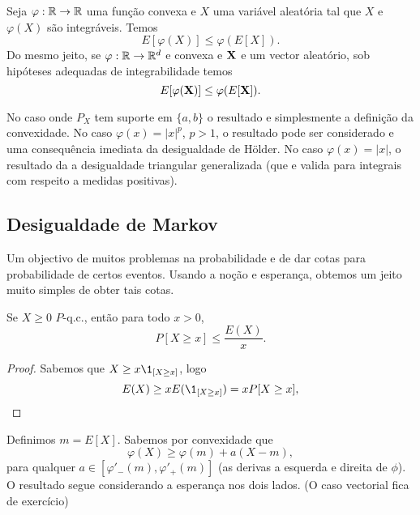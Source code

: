 \begin{proposition}
 Seja $\varphi:{\mathbb R} \to {\ensuremath{\mathbb R}}$ uma função convexa e $X$ uma variável  aleatória tal que $X$ e $\varphi(X)$ são integráveis.
 Temos
 \begin{equation}
  E[ \varphi(X) ] \le \varphi(E[X]).
 \end{equation}
 Do mesmo jeito, se $\varphi:{\mathbb R} \to {\ensuremath{\mathbb R}}^d$ e convexa e ${\bf X}$ e um vector aleatório, sob hipóteses adequadas de integrabilidade temos
  \begin{equation}
  E[ \varphi({\bf X}) ] \le \varphi(E[{\bf X}]).
 \end{equation}
\end{proposition}

\begin{remark}
  No caso onde $P_X$ tem suporte em $\{a,b\}$ o resultado e simplesmente a definição da convexidade.
  No caso $\varphi(x)=|x|^p$, $p>1$, o resultado pode ser considerado e uma consequência imediata da desigualdade de H\"older.
  No caso $\varphi(x)=|x|$, o resultado da a desigualdade triangular generalizada (que e valida para integrais com respeito a medidas positivas).
\end{remark}

\subsection{Desigualdade de Markov}

Um objectivo de muitos problemas na probabilidade e de dar cotas para probabilidade de certos eventos.
Usando a noção e esperança, obtemos um jeito muito simples de obter tais cotas.

\begin{theorem}
  \label{t:markov}
  Se $X \geq 0$ $P$-q.c., então para todo $x > 0$,
  \begin{equation}
    P[X \geq x] \leq \frac{E(X)}{x}.
  \end{equation}
\end{theorem}

\begin{proof}
  Sabemos que $X \geq x \1_{[X \geq x]}$, logo
  \begin{equation}
    E(X) \geq x E(\1_{[X \geq x]}) = x P[X \geq x],
  \end{equation}
\end{proof}



Definimos $m=E[X]$.
Sabemos por convexidade que
$$\varphi(X)\ge \varphi(m)+ a(X-m),$$
para qualquer $a\in [\varphi'_-(m), \varphi'_+(m)]$ (as derivas a esquerda e direita de $\phi$).
O resultado segue considerando a esperança nos dois lados.
(O caso vectorial fica de exercício)

